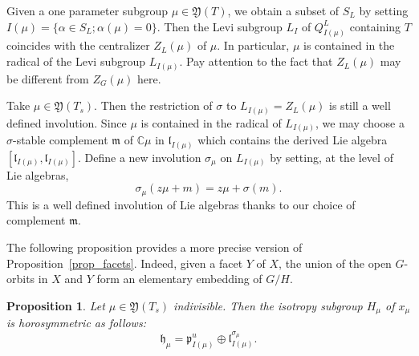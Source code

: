\documentclass{amsart}
\newtheorem{prop}[thm]{Proposition}
\theoremstyle{definition}
\begin{document}
Given a one parameter subgroup $\mu\in \mathfrak{Y}(T)$, we obtain a subset 
of $S_L$ by setting $I(\mu)=\{\alpha\in S_L; \alpha(\mu)=0\}$. 
Then the 
Levi subgroup $L_I$ of $Q^L_{I(\mu)}$ containing $T$ coincides with 
the centralizer $Z_L(\mu)$ of $\mu$. 
In particular, $\mu$ is contained in the radical of the Levi subgroup $L_{I(\mu)}$.
Pay attention to the fact that $Z_L(\mu)$ may be different from $Z_G(\mu)$ here.

Take $\mu\in \mathfrak{Y}(T_s)$. Then the restriction of $\sigma$ to 
$L_{I(\mu)}=Z_L(\mu)$ is still a well defined involution. 
Since $\mu$ is contained in the radical of $L_{I(\mu)}$, we may 
choose a $\sigma$-stable complement $\mathfrak{m}$ of $\mathbb{C}\mu$ 
in $\mathfrak{l}_{I(\mu)}$ which contains the derived Lie algebra 
$[\mathfrak{l}_{I(\mu)},\mathfrak{l}_{I(\mu)}]$.
Define a new involution $\sigma_{\mu}$ on $L_{I(\mu)}$ by setting, 
at the level of Lie algebras, 
\[
\sigma_{\mu}(z\mu+m)=z\mu+\sigma(m).
\]
This is a well defined involution of Lie algebras thanks to our choice of 
complement $\mathfrak{m}$.

The following proposition provides a more precise version of  
Proposition~\ref{prop_facets}. Indeed, given a facet $Y$ of $X$, the union of 
the open $G$-orbits in $X$ and $Y$ form an elementary embedding of $G/H$.

\begin{prop}
\label{prop_isotropy_facets}
Let $\mu\in \mathfrak{Y}(T_s)$ indivisible. Then the isotropy subgroup 
$H_{\mu}$ of $x_{\mu}$ is horosymmetric as follows:
\[
\mathfrak{h}_{\mu} = \mathfrak{p}_{I(\mu)}^u \oplus 
\mathfrak{l}_{I(\mu)}^{\sigma_{\mu}}.
\]
\end{prop}
\end{document}
